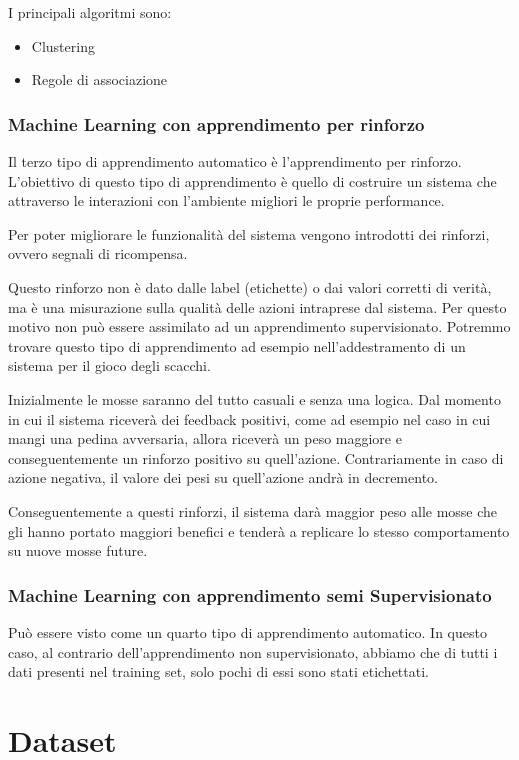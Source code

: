 \documentclass[12pt,italian]{report}
\begin{document}
I principali algoritmi sono:
\begin{itemize}
	\item Clustering
	\item Regole di associazione
\end{itemize}
\subsection{Machine Learning con apprendimento per rinforzo}
Il terzo tipo di apprendimento automatico è l’apprendimento per rinforzo. L’obiettivo di questo tipo di apprendimento è quello di costruire un sistema che attraverso le interazioni con l’ambiente migliori le proprie performance.

Per poter migliorare le funzionalità del sistema vengono introdotti dei rinforzi, ovvero segnali di ricompensa.

Questo rinforzo non è dato dalle label (etichette) o dai valori corretti di verità, ma è una misurazione sulla qualità delle azioni intraprese dal sistema. Per questo motivo non può essere assimilato ad un apprendimento supervisionato.
Potremmo trovare questo tipo di apprendimento ad esempio nell’addestramento di un sistema per il gioco degli scacchi.

Inizialmente le mosse saranno del tutto casuali e senza una logica. Dal momento in cui il sistema riceverà dei feedback positivi, come ad esempio nel caso in cui mangi una pedina avversaria, allora riceverà un peso maggiore e conseguentemente un rinforzo positivo su quell’azione. Contrariamente in caso di azione negativa, il valore dei pesi su quell’azione andrà in decremento.

Conseguentemente a questi rinforzi, il sistema darà maggior peso alle mosse che gli hanno portato maggiori benefici e tenderà a replicare lo stesso comportamento su nuove mosse future.
\subsection{Machine Learning con apprendimento semi Supervisionato}
Può essere visto come un quarto tipo di apprendimento automatico. In questo caso, al contrario dell’apprendimento non supervisionato, abbiamo che di tutti i dati presenti nel training set, solo pochi di essi sono stati etichettati.
% 
% 

\chapter{Dataset}
\end{document}
